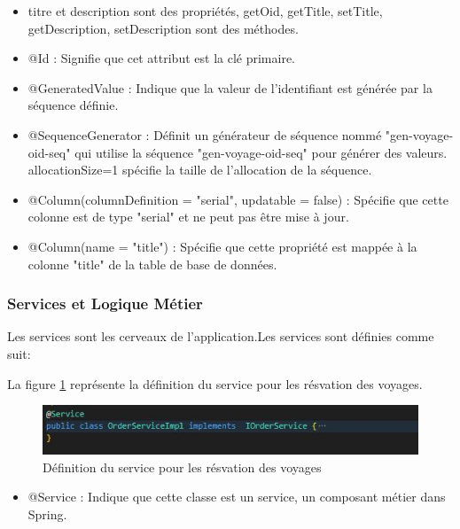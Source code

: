 \documentclass[12pt]{report}
\begin{document}
			\begin{itemize}
				\item titre et description sont des propriétés, getOid, getTitle, setTitle, getDescription, setDescription sont des méthodes.
				\item @Id : Signifie que cet attribut est la clé primaire.
				\item @GeneratedValue : Indique que la valeur de l'identifiant est générée par la séquence définie.
				\item @SequenceGenerator : Définit un générateur de séquence nommé "gen-voyage-oid-seq" qui utilise la séquence "gen-voyage-oid-seq" pour générer des valeurs. allocationSize=1 spécifie la taille de l'allocation de la séquence.
				\item @Column(columnDefinition = "serial", updatable = false) : Spécifie que cette colonne est de type "serial" et ne peut pas être mise à jour.
				\item @Column(name = "title") : Spécifie que cette propriété est mappée à la colonne "title" de la table de base de données.
			\end{itemize}
			
			
			\subsubsection{Services et Logique Métier}

			\hspace{15pt} Les services sont les cerveaux de l'application.Les services sont définies comme suit:

			La figure \ref{fig:service} représente la définition du service pour les résvation des voyages.
			
			\begin{figure}[h]
				\centering
				\includegraphics[width=\textwidth]{service.jpg}
				\caption{Définition du service pour les résvation des voyages}
				\label{fig:service}
			\end{figure}
			\FloatBarrier

			\begin{itemize}
				\item @Service : Indique que cette classe est un service, un composant métier dans Spring.
			\end{itemize}
\end{document}
